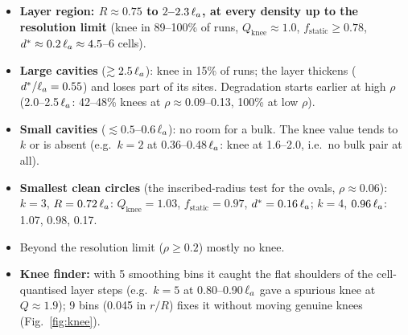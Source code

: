 \begin{itemize}
  \item \textbf{Layer region: $R\approx0.75$ to $2$--$2.3\,\ell_a$, at every density up to the resolution limit} (knee in 89--100\%
        of runs, $Q_\mathrm{knee}\approx1.0$, $f_\mathrm{static}\ge0.78$, $d^*\approx0.2\,\ell_a\approx4.5$--6 cells).
  \item \textbf{Large cavities} ($\gtrsim2.5\,\ell_a$): knee in 15\% of runs; the layer thickens ($d^*/\ell_a=0.55$) and loses part
        of its sites. Degradation starts earlier at high $\rho$ (2.0--2.5\,$\ell_a$: 42--48\% knees at $\rho\approx0.09$--0.13,
        100\% at low $\rho$).
  \item \textbf{Small cavities} ($\lesssim0.5$--$0.6\,\ell_a$): no room for a bulk. The knee value tends to $k$ or is absent
        (e.g.\ $k=2$ at 0.36--0.48\,$\ell_a$: knee at 1.6--2.0, i.e.\ no bulk pair at all).
  \item \textbf{Smallest clean circles} (the inscribed-radius test for the ovals, $\rho\approx0.06$): $k=3$, $R=0.72\,\ell_a$:
        $Q_\mathrm{knee}=1.03$, $f_\mathrm{static}=0.97$, $d^*=0.16\,\ell_a$; $k=4$, $0.96\,\ell_a$: 1.07, 0.98, 0.17.
  \item Beyond the resolution limit ($\rho\ge0.2$) mostly no knee.
  \item \textbf{Knee finder:} with 5 smoothing bins it caught the flat shoulders of the cell-quantised layer steps (e.g.\
        $k=5$ at 0.80--0.90\,$\ell_a$ gave a spurious knee at $Q\approx1.9$); 9 bins (0.045 in $r/R$) fixes it without moving genuine knees (Fig.~\ref{fig:knee}).
\end{itemize}
